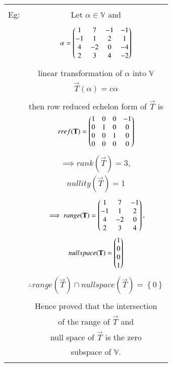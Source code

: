 \begin{table}[h!]
\begin{center}
\begin{tabular}{|c|c|}
\hline
& \\
Eg: & Let $\alpha \in \mathbb{V}$ and\\
& \\
& $\alpha = \begin{pmatrix}1&7&-1&-1\\-1&1&2&1\\4&-2&0&-4\\2&3&4&-2\end{pmatrix}$\\
& \\
& linear transformation of $\alpha$ into $\mathbb{V}$\\
& $\vec{T}(\alpha) = c\alpha$\\
& \\
& then row reduced echelon form of $\vec{T}$ is\\
& $rref(\mathbf{T}) = \begin{pmatrix}1&0&0&-1\\0&1&0&0\\0&0&1&0\\0&0&0&0\end{pmatrix}$\\
& \\
& $\implies rank(\vec{T}) = 3,$\\
& $nullity(\vec{T}) = 1$\\
& \\
& $\implies range(\mathbf{T}) = \begin{pmatrix}1&7&-1\\-1&1&2\\4&-2&0\\2&3&4\end{pmatrix},$\\
& $null space(\mathbf{T}) = \begin{pmatrix}1\\0\\0\\1\end{pmatrix}$\\
& \\
& $\therefore range(\vec{T}) \cap null space(\vec{T}) = \left\lbrace 0 \right\rbrace$\\
& \\
& Hence proved that the intersection \\
& of the range of $\vec{T}$ and \\
& null space of $\vec{T}$ is the zero \\
& subspace of $\mathbb{V}$.\\
& \\
\hline
\end{tabular}
\end{center}
\end{table}

